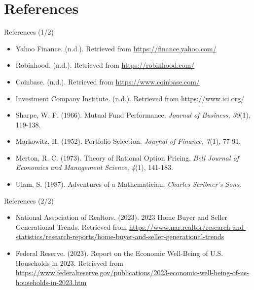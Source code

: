 \documentclass{beamer}
\begin{document}
\section{References}
\begin{frame}{References (1/2)}
    \begin{itemize}
        \item Yahoo Finance. (n.d.). Retrieved from \url{https://finance.yahoo.com/}
        \item Robinhood. (n.d.). Retrieved from \url{https://robinhood.com/}
        \item Coinbase. (n.d.). Retrieved from \url{https://www.coinbase.com/}
        \item Investment Company Institute. (n.d.). Retrieved from \url{https://www.ici.org/}
        \item Sharpe, W. F. (1966). Mutual Fund Performance. \textit{Journal of Business, 39}(1), 119-138.
        \item Markowitz, H. (1952). Portfolio Selection. \textit{Journal of Finance, 7}(1), 77-91.
        \item Merton, R. C. (1973). Theory of Rational Option Pricing. \textit{Bell Journal of Economics and Management Science, 4}(1), 141-183.
        \item Ulam, S. (1987). Adventures of a Mathematician. \textit{Charles Scribner's Sons}.
    \end{itemize}
\end{frame}

\begin{frame}{References (2/2)}
    \begin{itemize}
        \item National Association of Realtors. (2023). 2023 Home Buyer and Seller Generational Trends. Retrieved from \url{https://www.nar.realtor/research-and-statistics/research-reports/home-buyer-and-seller-generational-trends}
        \item Federal Reserve. (2023). Report on the Economic Well-Being of U.S. Households in 2023. Retrieved from \url{https://www.federalreserve.gov/publications/2023-economic-well-being-of-us-households-in-2023.htm}
    \end{itemize}
\end{frame}
\end{document}
